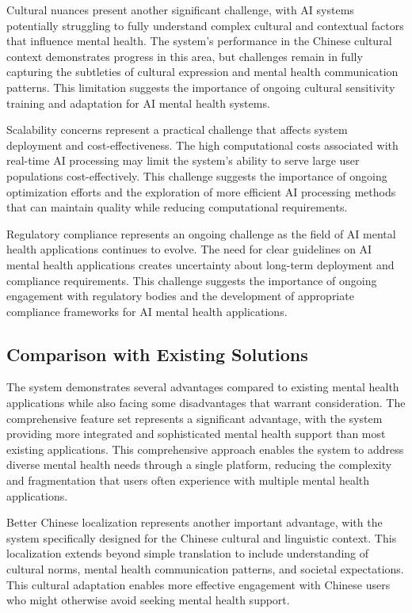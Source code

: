 Cultural nuances present another significant challenge, with AI systems potentially struggling to fully understand complex cultural and contextual factors that influence mental health. The system's performance in the Chinese cultural context demonstrates progress in this area, but challenges remain in fully capturing the subtleties of cultural expression and mental health communication patterns. This limitation suggests the importance of ongoing cultural sensitivity training and adaptation for AI mental health systems.

Scalability concerns represent a practical challenge that affects system deployment and cost-effectiveness. The high computational costs associated with real-time AI processing may limit the system's ability to serve large user populations cost-effectively. This challenge suggests the importance of ongoing optimization efforts and the exploration of more efficient AI processing methods that can maintain quality while reducing computational requirements.

Regulatory compliance represents an ongoing challenge as the field of AI mental health applications continues to evolve. The need for clear guidelines on AI mental health applications creates uncertainty about long-term deployment and compliance requirements. This challenge suggests the importance of ongoing engagement with regulatory bodies and the development of appropriate compliance frameworks for AI mental health applications.

\subsection{Comparison with Existing Solutions}

The system demonstrates several advantages compared to existing mental health applications while also facing some disadvantages that warrant consideration. The comprehensive feature set represents a significant advantage, with the system providing more integrated and sophisticated mental health support than most existing applications. This comprehensive approach enables the system to address diverse mental health needs through a single platform, reducing the complexity and fragmentation that users often experience with multiple mental health applications.

Better Chinese localization represents another important advantage, with the system specifically designed for the Chinese cultural and linguistic context. This localization extends beyond simple translation to include understanding of cultural norms, mental health communication patterns, and societal expectations. This cultural adaptation enables more effective engagement with Chinese users who might otherwise avoid seeking mental health support.

